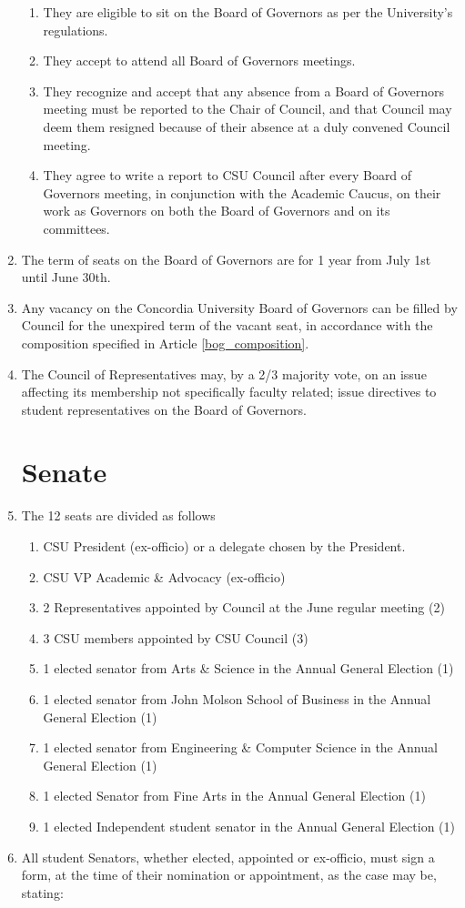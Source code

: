 \documentclass[oneside]{book}
\begin{document}
\begin{enumerate}
\begin{enumerate}
\item They are eligible to sit on the Board of Governors as per the University's
regulations. 
\item They accept to attend all Board of Governors meetings. 
\item They recognize and accept that any absence from a Board of Governors
meeting must be reported to the Chair of Council, and that Council
may deem them resigned because of their absence at a duly convened
Council meeting. 
\item They agree to write a report to CSU Council after every Board of Governors
meeting, in conjunction with the Academic Caucus, on their work as
Governors on both the Board of Governors and on its committees. 
\end{enumerate}
\item The term of seats on the Board of Governors are for 1 year from July
1st until June 30th. 
\item Any vacancy on the Concordia University Board of Governors can be
filled by Council for the unexpired term of the vacant seat, in accordance with 
the composition specified in Article \ref{bog_composition}.
\item The Council of Representatives may, by a 2/3 majority vote, on an
issue affecting its membership not specifically faculty related; issue
directives to student representatives on the Board of Governors. 

\chapter{\label{Senate}Senate }
\item The 12 seats are divided as follows 

\begin{enumerate}
\item CSU President (ex-officio) or a delegate chosen by the President. 
\item CSU VP Academic \& Advocacy (ex-officio) 
\item 2 Representatives appointed by Council at the June regular meeting
(2) 
\item 3 CSU members appointed by CSU Council (3) 
\item 1 elected senator from Arts \& Science in the Annual General Election
(1) 
\item 1 elected senator from John Molson School of Business in the Annual
General Election (1) 
\item 1 elected senator from Engineering \& Computer Science in the Annual
General Election (1) 
\item 1 elected Senator from Fine Arts in the Annual General Election (1) 
\item 1 elected Independent student senator in the Annual General Election
(1) 
\end{enumerate}
\item \label{enu:senate-required-form}All student Senators, whether elected,
appointed or ex-officio, must sign a form, at the time of their nomination
or appointment, as the case may be, stating: 


\end{enumerate}
\end{document}
